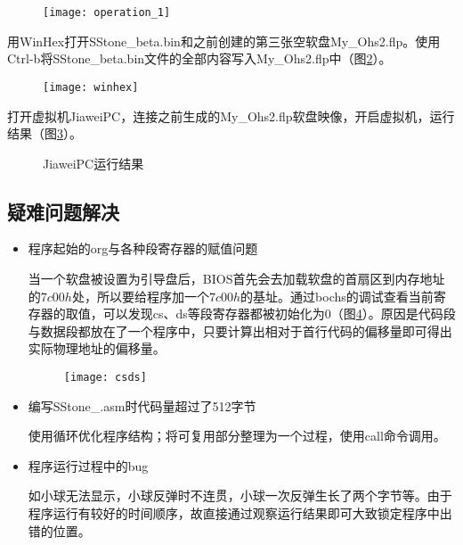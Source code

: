 \documentclass[a4paper,11pt,UTF8]{ctexart}
\newcommand{\bottomcaption}{%
\setlength{\abovecaptionskip}{6pt}%
\setlength{\belowcaptionskip}{6pt}%
\caption}
\newcommand{\xiaowuhao}{\fontsize{9pt}{\baselineskip}\selectfont}   %
\begin{document}
	\begin{figure}[htbp]
		\centering
		\texttt{[image: operation\_1]}
		\bottomcaption{\xiaowuhao{汇编生成bin文件}}
		\label{fig7}
	\end{figure}

	用WinHex打开SStone\_beta.bin和之前创建的第三张空软盘My\_Ohs2.flp。使用Ctrl-b将SStone\_beta.bin文件的全部内容写入My\_Ohs2.flp中（图\ref{fig8}）。
	
	\begin{figure}[htbp]
		\centering
		\texttt{[image: winhex]}
		\bottomcaption{\xiaowuhao{winhex制作启动盘}}
		\label{fig8}
	\end{figure}
	
	打开虚拟机JiaweiPC，连接之前生成的My\_Ohs2.flp软盘映像，开启虚拟机，运行结果（图\ref{fig9}）。

	\begin{figure}[htbp]
		\centering
	
		\quad
		\quad
		\quad
		\caption{JiaweiPC运行结果}
		\label{fig9}
	\end{figure}



\subsection{疑难问题解决}
	
	\begin{itemize}
		\item 程序起始的org与各种段寄存器的赋值问题
		
		当一个软盘被设置为引导盘后，BIOS首先会去加载软盘的首扇区到内存地址的$7c00h$处\cite{x86}，所以要给程序加一个$7c00h$的基址。通过bochs的调试查看当前寄存器的取值，可以发现cs、ds等段寄存器都被初始化为0（图\ref{fig10}）。原因是代码段与数据段都放在了一个程序中，只要计算出相对于首行代码的偏移量即可得出实际物理地址的偏移量。
		
		\begin{figure}[htbp]
			\centering
			\texttt{[image: csds]}
			\bottomcaption{\xiaowuhao{段寄存器初始化}}
			\label{fig10}
		\end{figure}
		
		\item 编写SStone\_.asm时代码量超过了512字节
		
		使用循环优化程序结构；将可复用部分整理为一个过程，使用call命令调用。
		
		\item 程序运行过程中的bug
		
		如小球无法显示，小球反弹时不连贯，小球一次反弹生长了两个字节等。由于程序运行有较好的时间顺序，故直接通过观察运行结果即可大致锁定程序中出错的位置。
			
	\end{itemize}
\end{document}
